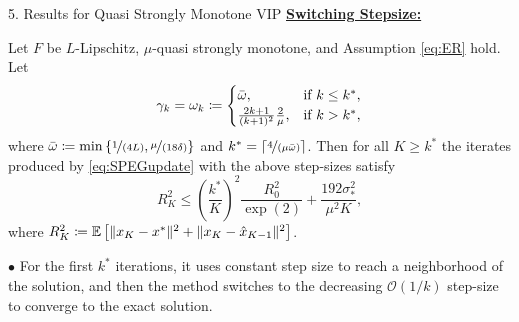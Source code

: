 \documentclass[24pt,final]{beamer}
\newlength{\onecolwid}
\newlength{\twocolwid}
\begin{document}
\begin{frame}[t]
\begin{columns}[t]
\begin{column}{\twocolwid}
\begin{columns}[t,totalwidth=\twocolwid]
\begin{column}{\onecolwid}
\begin{block}{5. Results for Quasi Strongly Monotone VIP}
\underline{\textbf{Switching Stepsize:}}
\begin{tcolorbox}[colback=green!5!white,colframe=green!50!black,title={Theorem}]
   Let $F$ be $L$-Lipschitz, $\mu$-quasi strongly monotone, and Assumption \ref{eq:ER} hold. Let
\begin{equation*}
    \gamma_k = \omega_k \coloneqq 
\begin{cases}
\Bar{\omega}, &\text{if } k \leq k^*, \\
\frac{2k+1}{(k+1)^2}\frac{2}{\mu}, &\text{if } k > k^*,
\end{cases}\label{eq:stepsize_switching_1}
\end{equation*}
where $\Bar{\omega} \coloneqq \min \left \{\nicefrac{1}{(4L)},\nicefrac{\mu}{(18 \delta)} \right\}$ and $k^* = \lceil \nicefrac{4}{(\mu \Bar{\omega})} \rceil$. Then for all $K \geq k^*$ the iterates produced by \ref{eq:SPEGupdate} with the above step-sizes satisfy 
\begin{equation*}
    R_{K}^2  \leq \left(\frac{k^*}{K}\right)^2 \frac{R_0^2}{\exp(2)} + \frac{192 \sigma_*^2}{\mu^2 K}, \label{eq:SPEG_convergence_decr_steps_1}
\end{equation*}
where $R_{K}^2 \coloneqq \mathbb{E}\left[ \|x_{K} - x^*\|^2 + \|x_{K} - \hat{x}_{K-1}\|^2\right]$.
\end{tcolorbox}
$\bullet$  For the first $k^*$ iterations, it uses constant step size to reach a neighborhood of the solution, and then the method switches to the
decreasing $\mathcal{O}(1/k)$ step-size to converge to the exact solution.
\end{block}	


\end{column}
\end{columns}
\end{column}
\end{columns}
\end{frame}
\end{document}
